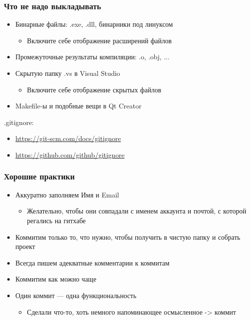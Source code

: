 \documentclass[xetex,mathserif,serif]{beamer}
\begin{document}
	\begin{frame}
		\frametitle{Что не надо выкладывать}
		\begin{itemize}
			\item Бинарные файлы: .exe, .dll, бинарники под линуксом
			\begin{itemize}
				\item Включите себе отображение расширений файлов
			\end{itemize}
			\item Промежуточные результаты компиляции: .o, .obj, ...
			\item Скрытую папку .vs в Visual Studio
			\begin{itemize}
				\item Включите себе отображение скрытых файлов
			\end{itemize}
			\item Makefile-ы и подобные вещи в Qt Creator
		\end{itemize}
		.gitignore:
		\begin{itemize}
			\item \url{https://git-scm.com/docs/gitignore}
			\item \url{https://github.com/github/gitignore}
		\end{itemize}
	\end{frame}

	\begin{frame}
		\frametitle{Хорошие практики}
		\begin{itemize}
			\item Аккуратно заполняем Имя и Email
			\begin{itemize}
				\item Желательно, чтобы они совпадали с именем аккаунта и почтой, с которой регались на гитхабе
			\end{itemize}
			\item Коммитим только то, что нужно, чтобы получить в чистую папку и собрать проект
			\item Всегда пишем адекватные комментарии к коммитам
			\item Коммитим как можно чаще
			\item Один коммит --- одна функциональность
			\begin{itemize}
				\item Сделали что-то, хоть немного напоминающее осмысленное -> коммит
			\end{itemize}
		\end{itemize}
	\end{frame}
\end{document}
